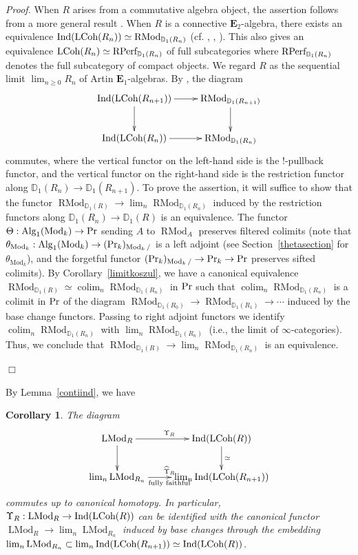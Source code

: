 \documentclass[leqno,12pt]{amsart}
\theoremstyle{plain}
\newtheorem{Corollary}[Theorem]{Corollary}
\theoremstyle{definition}
\newcommand{\DD}{\mathbb{D}}
\newcommand{\PR}{\textup{Pr}}
\newcommand{\Mod}{\operatorname{Mod}}
\newcommand{\colim}{\operatorname{colim}}
\newcommand{\Alg}{\operatorname{Alg}}
\newcommand{\Ind}{\operatorname{Ind}}
\newcommand{\eone}{\mathbf{E}_1}
\newcommand{\etwo}{\mathbf{E}_2}
\newcommand{\LMod}{\operatorname{LMod}}
\newcommand{\RMod}{\operatorname{RMod}}
\newcommand{\Proof}{{\sl Proof.}\quad}
\newcommand{\QED}{{\unskip\nobreak\hfil\penalty50\quad\null\nobreak\hfil
{$\Box$}\parfillskip0pt\finalhyphendemerits0\par\medskip}}
\begin{document}
\Proof
When $R$ arises from a commutative algebra object, the assertion follows from a more general result \cite[Vol.I, Chapter 4, Proposition 6.4.3]{Gai2}.
When $R$ is a connective $\etwo$-algebra, there exists an equivalence
$\Ind(\textup{LCoh}(R_n))\simeq \RMod_{\DD_1(R_n)}$ (cf. \cite[Lemma 2.6 (1)]{CKDA}, \cite[proof of Lemma 3.11]{IH}, \cite[X, Theorem 3.5.1]{DAG}).
This also gives an equivalence $\textup{LCoh}(R_n)\simeq \textup{RPerf}_{\DD_1(R_n)}$ of full subcategories
where $\textup{RPerf}_{\DD_1(R_n)}$ denotes the full subcategory of compact objects.
We regard 
$R$ as the sequential limit $\lim_{n\ge0 }R_n$ of Artin $\eone$-algebras.
By \cite[Lemma 2.6 (2)]{CKDA}, the diagram
\[
\xymatrix{
\Ind(\textup{LCoh}(R_{n+1}))\ar[r] \ar[d] &  \RMod_{\DD_1(R_{n+1})} \ar[d] \\
\Ind(\textup{LCoh}(R_n))\ar[r] &    \RMod_{\DD_1(R_n)}
}
\]
commutes,
where the vertical functor on the left-hand side is the $!$-pullback functor, and the vertical functor on the right-hand side
is the restriction functor along $\DD_1(R_n)\to \DD_1(R_{n+1})$.
To prove the assertion, it will suffice to show that 
the functor
$\RMod_{\DD_1(R)}\to \lim_{n}\RMod_{\DD_1(R_n)}$
induced by the restriction functors along $\DD_1(R_n)\to \DD_1(R)$ is an equivalence.
The functor $\Theta:\Alg_1(\Mod_k)\to \PR$ sending $A$ to $\RMod_{A}$ preserves filtered colimits
(note that $\theta_{\Mod_k}:\Alg_1(\Mod_k)\to (\PR_k)_{\Mod_k/}$ is a left adjoint (see Section~\ref{thetasection} for $\theta_{\Mod_k}$), and the forgetful functor $(\PR_k)_{\Mod_k/}\to \PR_k\to \PR$ preserves sifted colimits).
By Corollary~\ref{limitkoszul}, we have a canonical equivalence $\RMod_{\DD_1(R)}\simeq \colim_{n}\RMod_{\DD_1(R_n)}$ in $\PR$
such that $\colim_{n}\RMod_{\DD_1(R_n)}$ is a colimit in $\PR$ of the diagram
$\RMod_{\DD_1(R_0)}\to\RMod_{\DD_1(R_1)}\to \cdots$ induced by the base change functors.
Passing to right adjoint functors we identify $\colim_{n}\RMod_{\DD_1(R_n)}$
with $\lim_{n}\RMod_{\DD_1(R_n)}$ (i.e., the limit of $\infty$-categories).
Thus, we conclude that $\RMod_{\DD_1(R)}\to \lim_{n}\RMod_{\DD_1(R_n)}$ is an equivalence.
\QED

By Lemma~\ref{contiind}, we have 

\begin{Corollary}
\label{upsilonlimit}
The diagram
\[
\xymatrix{
\LMod_R \ar[r]^{\Upsilon_R} \ar[d] & \Ind(\textup{LCoh}(R)) \ar[d]^{\simeq} \\
\lim_n\LMod_{R_n} \ar[r]_{\textup{fully faithful}}^{\widehat{\Upsilon}_R}&  \lim_n\Ind(\textup{LCoh}(R_{n+1}))
}
\]
commutes up to canonical homotopy.
In particular, $\Upsilon_R:\LMod_R \to \Ind(\textup{LCoh}(R))$ can be identified with 
the canonical functor $\LMod_R\to\lim_n\LMod_{R_n}$ induced by base changes through the embedding $\lim_n\LMod_{R_n}\subset \lim_n\Ind(\textup{LCoh}(R_{n+1}))\simeq \Ind(\textup{LCoh}(R))$.
\end{Corollary}
\end{document}
